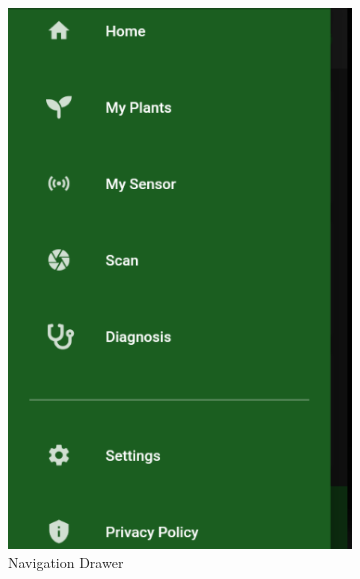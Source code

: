 \documentclass[a4paper,12pt]{report}
\begin{document}
\begin{figure}[H]
	
	\begin{subfigure}{0.3\textwidth} %
		\includegraphics[width=\textwidth]{./images/navigation_drawer/navigation_drawer.png}
		\caption{Navigation Drawer}
		\label{fig:navigation_drawer}
	\end{subfigure}
	\hfill
	\begin{subfigure}{0.3\textwidth}

\end{subfigure}
\end{figure}
\end{document}

